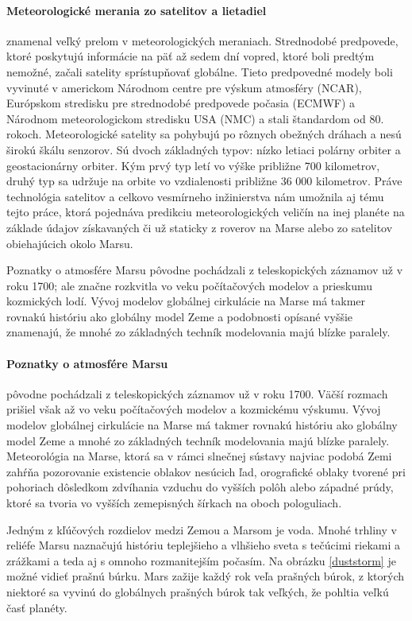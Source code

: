 \paragraph{Meteorologické merania zo satelitov a lietadiel} znamenal veľký prelom v meteorologických meraniach. Strednodobé predpovede, ktoré poskytujú informácie na päť až sedem dní vopred, ktoré boli predtým nemožné, začali satelity sprístupňovať globálne. Tieto predpovedné modely boli vyvinuté v americkom Národnom centre pre výskum atmosféry (NCAR), Európskom stredisku pre strednodobé predpovede počasia (ECMWF) a Národnom meteorologickom stredisku USA (NMC) a stali štandardom od 80. rokoch. Meteorologické satelity sa pohybujú po rôznych obežných dráhach a nesú širokú škálu senzorov. Sú dvoch základných typov: nízko letiaci polárny orbiter a geostacionárny orbiter. Kým prvý typ letí vo výške približne 700 kilometrov, druhý typ sa udržuje na orbite vo vzdialenosti približne 36 000 kilometrov. Práve technológia satelitov a celkovo vesmírneho inžinierstva nám umožnila aj tému tejto práce, ktorá pojednáva predikciu meteorologických veličín na inej planéte na základe údajov získavaných či už staticky z roverov na Marse alebo zo satelitov obiehajúcich okolo Marsu.

Poznatky o atmosfére Marsu pôvodne pochádzali z teleskopických záznamov už v roku 1700; ale značne rozkvitla vo veku počítačových modelov a prieskumu kozmických lodí. Vývoj modelov globálnej cirkulácie na Marse má takmer rovnakú históriu ako globálny model Zeme a podobnosti opísané vyššie znamenajú, že mnohé zo základných techník modelovania majú blízke paralely.


\paragraph{Poznatky o atmosfére Marsu} pôvodne pochádzali z teleskopických záznamov už v roku 1700. Väčší rozmach prišiel však až vo veku počítačových modelov a kozmickému výskumu. Vývoj modelov globálnej cirkulácie na Marse má takmer rovnakú históriu ako globálny model Zeme a mnohé zo základných techník modelovania majú blízke paralely. Meteorológia na Marse, ktorá sa v rámci slnečnej sústavy najviac podobá Zemi zahŕňa pozorovanie existencie oblakov nesúcich ľad, orografické oblaky tvorené pri pohoriach dôsledkom zdvíhania vzduchu do vyšších polôh alebo západné prúdy, ktoré sa tvoria vo vyšších zemepisných šírkach na oboch pologuliach.

Jedným z kľúčových rozdielov medzi Zemou a Marsom je voda. Mnohé trhliny v reliéfe Marsu naznačujú históriu teplejšieho a vlhšieho sveta s tečúcimi riekami a zrážkami a teda aj s omnoho rozmanitejším počasím. Na obrázku \ref{duststorm} je možné vidieť prašnú búrku. Mars zažije každý rok veľa prašných búrok, z ktorých niektoré sa vyvinú do globálnych prašných búrok tak veľkých, že pohltia veľkú časť planéty.

